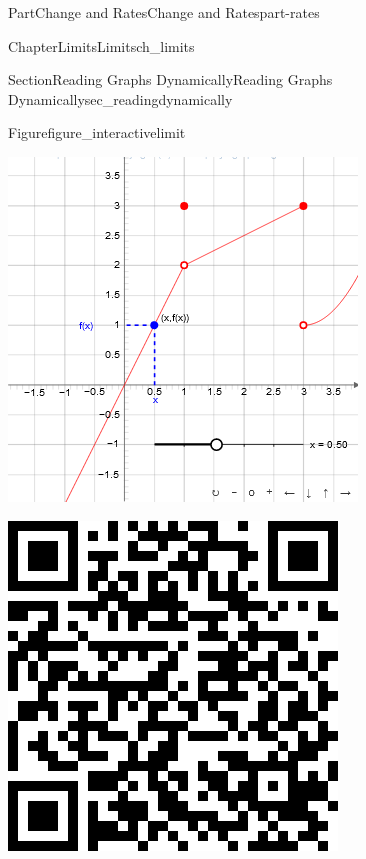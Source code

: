 \documentclass[oneside,10pt,]{tufte-book}
\numberwithin{equation}{chapter}
\begin{document}
\begin{partptx}{Part}{Change and Rates}{}{Change and Rates}{}{}{part-rates}
\begin{chapterptx}{Chapter}{Limits}{}{Limits}{}{}{ch_limits}
\begin{sectionptx}{Section}{Reading Graphs Dynamically}{}{Reading Graphs Dynamically}{}{}{sec_readingdynamically}
\begin{figureptx}{Figure}{}{figure_interactivelimit}{}
\begin{sidebyside}{2}{0.075}{0.075}{0.17}
\begin{sbspanel}{0.47}
\includegraphics[width=\linewidth]{external/jsxgraph-limitpicewise.png}
\end{sbspanel}%
\begin{sbspanel}{0.21}%
\includegraphics[width=\linewidth]{generated/qrcode/figure_interactivelimit-2.png}

\end{sbspanel}
\end{sidebyside}
\end{figureptx}
\end{sectionptx}
\end{chapterptx}
\end{partptx}
\end{document}
